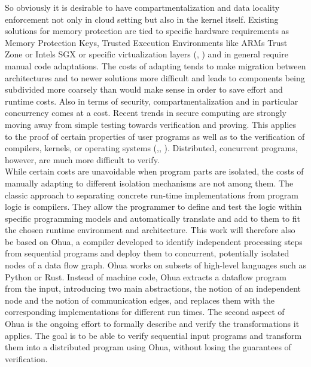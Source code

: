 So obviously it is desirable to have compartmentalization and data locality enforcement not only in cloud setting but also in the kernel itself. Existing solutions for memory protection are tied to specific hardware requirements as Memory Protection Keys, Trusted Execution Environments like ARMs Trust Zone\cite{pinto2019demystifying} or Intels SGX \cite{costan2016intel} or specific virtualization layers (\cite{tan2007ikernel}, \cite{nikolaev2013virtuos}) and in general require manual code adaptations. The costs of adapting tends to make migration between architectures and to newer solutions more difficult and leads to components being subdivided more coarsely than would make sense in order to save effort and runtime costs. Also in terms of security, compartmentalization and in particular concurrency comes at a cost. Recent trends in secure computing are strongly moving away from simple testing towards verification and proving. This applies to the proof of certain properties of user programs as well as to the verification of compilers, kernels, or operating systems (\cite{leroy2009formal},\cite{sL4Verf}, \cite{gu2016certikos}). Distributed, concurrent programs, however, are much more difficult to verify. \\

While certain costs are unavoidable when program parts are isolated, the costs of manually adapting to different isolation mechanisms are not among them. The classic approach to separating concrete run-time implementations from program logic is compilers. They allow the programmer to define and test the logic within specific programming models and automatically translate and add to them to fit the chosen runtime environment and architecture.
This work will therefore also be based on Ohua\cite{ertel2015ohua}, a compiler developed to identify independent processing steps from sequential programs and deploy them to concurrent, potentially isolated nodes of a data flow graph. Ohua works on subsets of high-level languages such as Python or Rust. Instead of machine code, Ohua extracts a dataflow program from the input, introducing two main abstractions, the notion of an independent node and the notion of communication edges, and replaces them with the corresponding implementations for different run times. The second aspect of Ohua is the ongoing effort to formally describe and verify the transformations it applies. The goal is to be able to verify sequential input programs and transform them into a distributed program using Ohua, without losing the guarantees of verification. \\

